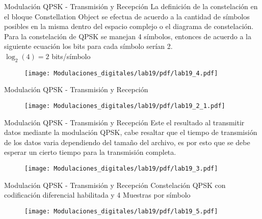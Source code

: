 \begin{frame}{Modulación QPSK - Transmisión y Recepción}
	\justifying
	La definición de la constelación en el bloque Constellation Object se efectua de acuerdo a la cantidad de símbolos posibles en la misma dentro del espacio complejo o el diagrama de constelación. Para la constelación de QPSK se manejan 4 símbolos, entonces de acuerdo a la siguiente ecuación los bits para cada símbolo serían 2.\\
	\centering
	$\log_{2}(4)=2$ bits/símbolo\\
	\begin{figure}
		\texttt{[image: Modulaciones\_digitales/lab19/pdf/lab19\_4.pdf]}
	\end{figure}
\end{frame}


\begin{frame}{Modulación QPSK - Transmisión y Recepción}
	\begin{figure}
		\texttt{[image: Modulaciones\_digitales/lab19/pdf/lab19\_2\_1.pdf]}
	\end{figure}
\end{frame}

\begin{frame}{Modulación QPSK - Transmisión y Recepción}
	\justifying
	Este el resultado al transmitir datos mediante la modulación QPSK, cabe resaltar que el tiempo de transmisión de los datos varia dependiendo del tamaño del archivo, es por esto que se debe esperar un cierto tiempo para la transmisión completa. 
	\begin{figure}
		\texttt{[image: Modulaciones\_digitales/lab19/pdf/lab19\_3.pdf]}
	\end{figure}
\end{frame}
\begin{frame}{Modulación QPSK - Transmisión y Recepción}
\justifying
Constelación QPSK con codificación diferencial habilitada y 4 Muestras por símbolo
\begin{figure}
\texttt{[image: Modulaciones\_digitales/lab19/pdf/lab19\_5.pdf]}
\end{figure}
\end{frame}
